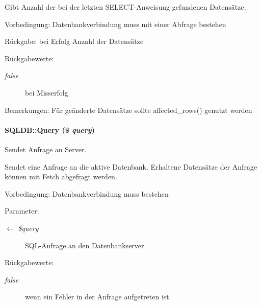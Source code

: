 Gibt Anzahl der bei der letzten SELECT-Anweisung gefundenen Datensätze. \begin{Desc}
\item[Vorbedingung:]Datenbankverbindung muss mit einer Abfrage bestehen \end{Desc}
\begin{Desc}
\item[R\"{u}ckgabe:]bei Erfolg Anzahl der Datensätze \end{Desc}
\begin{Desc}
\item[R\"{u}ckgabewerte:]
\begin{description}
\item[{\em false}]bei Misserfolg \end{description}
\end{Desc}
\begin{Desc}
\item[Bemerkungen:]Für geänderte Datensätze sollte affected\_\-rows() genutzt werden \end{Desc}
\hypertarget{classSQLDB_fc6ffa8df50f68f07d9f5e3385b96d7a}{
\paragraph[Query]{\setlength{\rightskip}{0pt plus 5cm}SQLDB::Query (\$ {\em query})}\hfill}
\label{classSQLDB_fc6ffa8df50f68f07d9f5e3385b96d7a}


Sendet Anfrage an Server. 

Sendet eine Anfrage an die aktive Datenbank. Erhaltene Datensätze der Anfrage können mit Fetch abgefragt werden. \begin{Desc}
\item[Vorbedingung:]Datenbankverbindung muss bestehen \end{Desc}
\begin{Desc}
\item[Parameter:]
\begin{description}
\item[\mbox{$\leftarrow$} {\em \$query}]SQL-Anfrage an den Datenbankserver \end{description}
\end{Desc}
\begin{Desc}
\item[R\"{u}ckgabewerte:]
\begin{description}
\item[{\em false}]wenn ein Fehler in der Anfrage aufgetreten ist \end{description}
\end{Desc}


